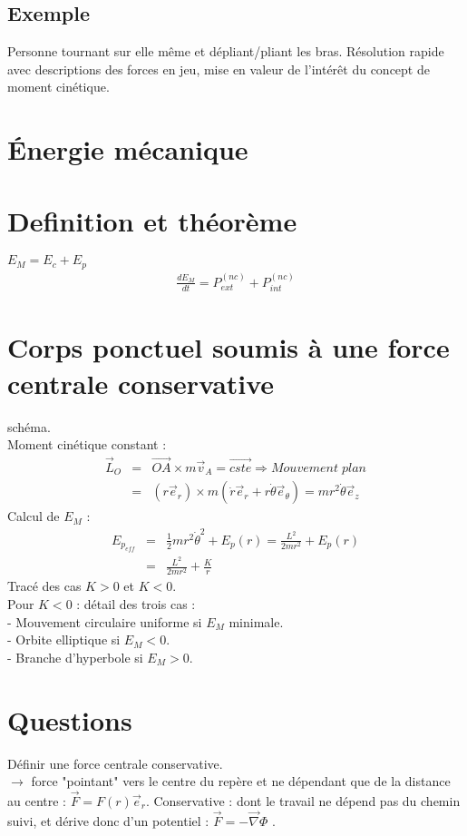 \documentclass[12pt,prb,aps,epsf]{report}
\begin{document}
\subsection{Exemple}

Personne tournant sur elle même et dépliant/pliant les bras.
Résolution rapide avec descriptions des forces en jeu, mise en valeur de l'intérêt du concept de moment cinétique.

\section{Énergie mécanique}
\section{Definition et théorème}
$E_M = E_c + E_p$
\begin{eqnarray}
\frac{dE_M}{dt} = P_{ext}^{(nc)} + P_{int}^{(nc)}
\end{eqnarray}
\section{Corps ponctuel soumis à une force centrale conservative}
schéma.\\
Moment cinétique constant :
\begin{eqnarray}
\vec{L}_O &=& \vec{OA}\times m \vec{v}_A = \vec{cste} \Rightarrow Mouvement\;plan\\
&=& (r\vec{e}_r)\times m(\dot{r}\vec{e}_r+r\dot{\theta}\vec{e}_{\theta}) = mr^2\dot{\theta}\vec{e}_z
\end{eqnarray}
Calcul de $E_M$ :
\begin{eqnarray}
E_{p_{eff}} &=&\frac{1}{2}mr^2\dot{\theta}^2 + E_p(r) = \frac{L^2}{2mr^2} + E_p(r)\\
&=& \frac{L^2}{2mr^2} + \frac{K}{r}
\end{eqnarray}
Tracé des cas $K>0$ et $K<0$.\\
Pour $K<0$ : détail des trois cas :\\
	- Mouvement circulaire uniforme si $E_M$ minimale. \\
	- Orbite elliptique si $E_M<0$.\\
	- Branche d'hyperbole si $E_M>0$.\\

\section{Questions}
Définir une force centrale conservative.\\
$\rightarrow$ force "pointant" vers le centre du repère et ne dépendant que de la distance au centre : $\vec{F}= F(r) \vec{e}_r$. Conservative : dont le travail ne dépend pas du chemin suivi, et dérive donc d'un potentiel : $\vec{F} = -\vec{\nabla}\Phi$   .\\
\end{document}
